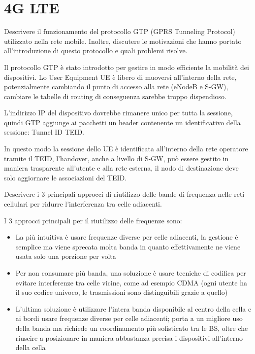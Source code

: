 \section{4G LTE}

\begin{questions}
    \question Descrivere il funzionamento del protocollo GTP (GPRS Tunneling Protocol) utilizzato nella rete mobile. Inoltre, discutere le motivazioni che hanno portato all'introduzione di questo protocollo e quali problemi risolve.
    
    \begin{solution}
        Il protocollo GTP è stato introdotto per gestire in modo efficiente la mobilità dei dispositivi. Lo User Equipment UE è libero di muoversi all'interno della rete, potenzialmente cambiando il punto di accesso alla rete (eNodeB e S-GW), cambiare le tabelle di routing di conseguenza sarebbe troppo dispendioso. 
        
        L'indirizzo IP del dispositivo dovrebbe rimanere unico per tutta la sessione, quindi GTP aggiunge ai pacchetti un header contenente un identificativo della sessione: Tunnel ID TEID. 
        
        In questo modo la sessione dello UE è identificata all'interno della rete operatore tramite il TEID, l'handover, anche a livello di S-GW, può essere gestito in maniera trasparente all'utente e alla rete esterna, il nodo di destinazione deve solo aggiornare le associazioni del TEID.
    \end{solution}
    
    \question Descrivere i 3 principali approcci di riutilizzo delle bande di frequenza nelle reti cellulari per ridurre l'interferenza tra celle adiacenti.
    
    \begin{solution}
        I 3 approcci principali per il riutilizzo delle frequenze sono: 
        \begin{itemize}
            \item La più intuitiva è usare frequenze diverse per celle adiacenti, la gestione è semplice ma viene sprecata molta banda in quanto effettivamente ne viene usata solo una porzione per volta
            
            \item Per non consumare più banda, una soluzione è usare tecniche di codifica per evitare interferenze tra celle vicine, come ad esempio CDMA (ogni utente ha il suo codice univoco, le trasmissioni sono distinguibili grazie a quello)
            
            \item L'ultima soluzione è utilizzare l'intera banda disponibile al centro della cella e ai bordi usare frequenze diverse per celle adiacenti; porta a un migliore uso della banda ma richiede un coordinamento più sofisticato tra le BS, oltre che riuscire a posizionare in maniera abbastanza precisa i dispositivi all'interno della cella
        \end{itemize}
    \end{solution}
\end{questions}